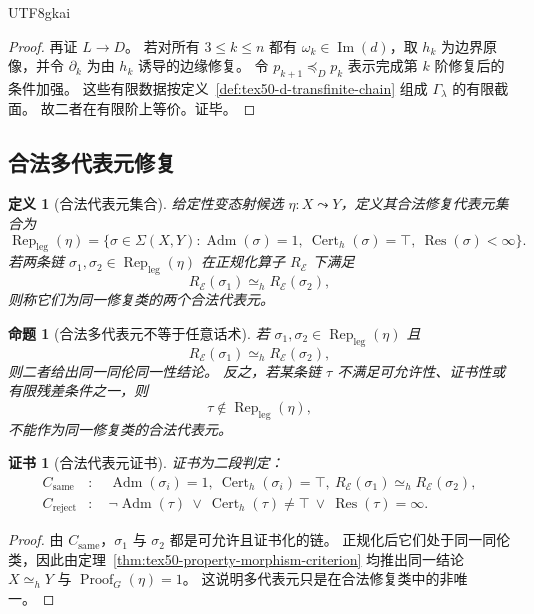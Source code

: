 \documentclass[12pt]{article}
\newtheorem{definition}{定义}[section]
\newtheorem{proposition}{命题}[section]
\newtheorem{Certificate}{证书}[section]
\newcommand{\Imop}{\operatorname{Im}}
\newcommand{\Adm}{\operatorname{Adm}}
\newcommand{\Cert}{\operatorname{Cert}}
\newcommand{\Proof}{\operatorname{Proof}}
\newcommand{\Res}{\operatorname{Res}}
\newcommand{\Rep}{\operatorname{Rep}}
\begin{document}
\begin{CJK*}{UTF8}{gkai}
\begin{proof}
再证 $L\to D$。
若对所有 $3\le k\le n$ 都有 $\omega_k\in\Imop(d)$，取 $h_k$ 为边界原像，并令 $\partial_k$ 为由 $h_k$ 诱导的边缘修复。
令 $p_{k+1}\preceq_D p_k$ 表示完成第 $k$ 阶修复后的条件加强。
这些有限数据按定义~\ref{def:tex50-d-transfinite-chain} 组成 $\Gamma_\lambda$ 的有限截面。
故二者在有限阶上等价。证毕。
\end{proof}

\subsection{合法多代表元修复}
\label{subsec:tex50-legal-representatives}

\begin{definition}[合法代表元集合]
\label{def:tex50-legal-repair-representatives}
给定性变态射候选 $\eta:X\leadsto Y$，定义其合法修复代表元集合为
\[
  \Rep_{\mathrm{leg}}(\eta)
  =
  \bigl\{
    \sigma\in\Sigma(X,Y):
    \Adm(\sigma)=1,\ 
    \Cert_h(\sigma)=\top,\ 
    \Res(\sigma)<\infty
  \bigr\}.
\]
若两条链 $\sigma_1,\sigma_2\in\Rep_{\mathrm{leg}}(\eta)$ 在正规化算子 $R_{\mathcal E}$ 下满足
\[
  R_{\mathcal E}(\sigma_1)\simeq_h R_{\mathcal E}(\sigma_2),
\]
则称它们为同一修复类的两个合法代表元。
\end{definition}

\begin{proposition}[合法多代表元不等于任意话术]
\label{prop:tex50-legal-representatives-not-anything}
若 $\sigma_1,\sigma_2\in\Rep_{\mathrm{leg}}(\eta)$ 且
\[
  R_{\mathcal E}(\sigma_1)\simeq_h R_{\mathcal E}(\sigma_2),
\]
则二者给出同一同伦同一性结论。
反之，若某条链 $\tau$ 不满足可允许性、证书性或有限残差条件之一，则
\[
  \tau\notin\Rep_{\mathrm{leg}}(\eta),
\]
不能作为同一修复类的合法代表元。
\end{proposition}

\begin{Certificate}[合法代表元证书]
证书为二段判定：
\[
\begin{aligned}
  C_{\mathrm{same}}&:\quad
  \Adm(\sigma_i)=1,\ \Cert_h(\sigma_i)=\top,\ R_{\mathcal E}(\sigma_1)\simeq_hR_{\mathcal E}(\sigma_2),\\
  C_{\mathrm{reject}}&:\quad
  \neg\Adm(\tau)\ \vee\ \Cert_h(\tau)\neq\top\ \vee\ \Res(\tau)=\infty.
\end{aligned}
\]
\end{Certificate}

\begin{proof}
由 $C_{\mathrm{same}}$，$\sigma_1$ 与 $\sigma_2$ 都是可允许且证书化的链。
正规化后它们处于同一同伦类，因此由定理~\ref{thm:tex50-property-morphism-criterion} 均推出同一结论 $X\simeq_hY$ 与 $\Proof_G(\eta)=1$。
这说明多代表元只是在合法修复类中的非唯一。


\end{proof}
\end{CJK*}
\end{document}
